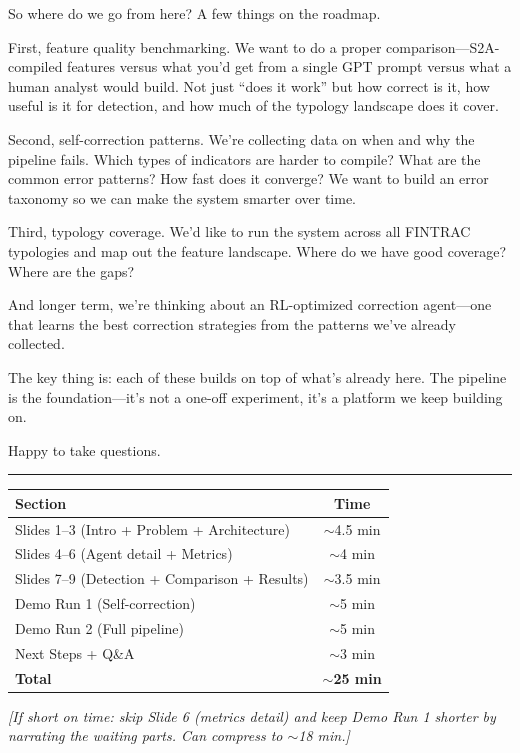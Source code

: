 \documentclass[11pt, a4paper]{article}
\newcommand{\note}[1]{\par{\small\color{note}\textit{[#1]}}\par}
\begin{document}
So where do we go from here? A few things on the roadmap.

First, feature quality benchmarking. We want to do a proper comparison---S2A-compiled features versus what you'd get from a single GPT prompt versus what a human analyst would build. Not just ``does it work'' but how correct is it, how useful is it for detection, and how much of the typology landscape does it cover.

Second, self-correction patterns. We're collecting data on when and why the pipeline fails. Which types of indicators are harder to compile? What are the common error patterns? How fast does it converge? We want to build an error taxonomy so we can make the system smarter over time.

Third, typology coverage. We'd like to run the system across all FINTRAC typologies and map out the feature landscape. Where do we have good coverage? Where are the gaps?

And longer term, we're thinking about an RL-optimized correction agent---one that learns the best correction strategies from the patterns we've already collected.

The key thing is: each of these builds on top of what's already here. The pipeline is the foundation---it's not a one-off experiment, it's a platform we keep building on.

Happy to take questions.

\vspace{1.5em}
\begin{center}
\color{gray}\rule{0.6\textwidth}{0.4pt}
\end{center}

\begin{center}
\small
\begin{tabular}{lc}
  \toprule
  \textbf{Section} & \textbf{Time} \\
  \midrule
  Slides 1--3 (Intro + Problem + Architecture) & $\sim$4.5 min \\
  Slides 4--6 (Agent detail + Metrics) & $\sim$4 min \\
  Slides 7--9 (Detection + Comparison + Results) & $\sim$3.5 min \\
  Demo Run 1 (Self-correction) & $\sim$5 min \\
  Demo Run 2 (Full pipeline) & $\sim$5 min \\
  Next Steps + Q\&A & $\sim$3 min \\
  \midrule
  \textbf{Total} & \textbf{$\sim$25 min} \\
  \bottomrule
\end{tabular}
\end{center}

\note{If short on time: skip Slide 6 (metrics detail) and keep Demo Run 1 shorter by narrating the waiting parts. Can compress to $\sim$18 min.}
\end{document}
